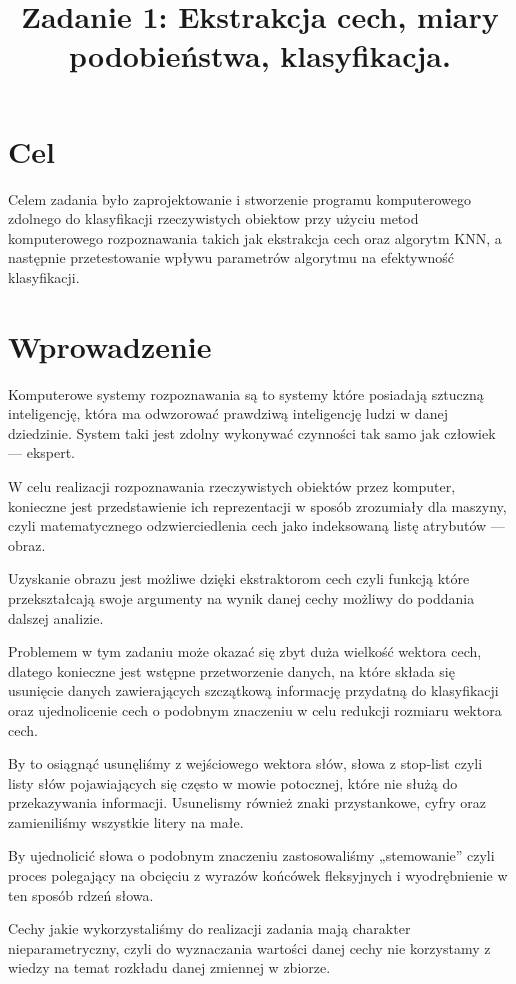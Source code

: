 \documentclass{classrep}
\author{
  \studentinfo{Bartosz Myśliwiec}{211827} \and
  \studentinfo{Mateusz Misiak}{211967} \and
}
\title{Zadanie 1:  Ekstrakcja cech, miary podobieństwa, klasyfikacja.}
\begin{document}
\maketitle

\section{Cel}

Celem zadania było zaprojektowanie i stworzenie programu komputerowego zdolnego do klasyfikacji 
rzeczywistych obiektow przy użyciu metod komputerowego rozpoznawania takich jak ekstrakcja cech oraz algorytm KNN, a następnie przetestowanie wpływu parametrów algorytmu na efektywność klasyfikacji.


\section{Wprowadzenie}
Komputerowe systemy rozpoznawania są to systemy które posiadają sztuczną inteligencję, która ma odwzorować prawdziwą inteligencję ludzi w danej dziedzinie. 
System taki jest zdolny wykonywać czynności tak samo jak człowiek — ekspert.


W celu realizacji rozpoznawania rzeczywistych obiektów przez komputer, konieczne jest przedstawienie ich reprezentacji w sposób zrozumiały dla maszyny, czyli matematycznego odzwierciedlenia cech jako indeksowaną listę atrybutów — obraz.


Uzyskanie obrazu jest możliwe dzięki ekstraktorom cech czyli funkcją które przekształcają swoje argumenty na wynik danej cechy możliwy do poddania dalszej analizie.


Problemem w tym zadaniu może okazać się zbyt duża wielkość wektora cech, dlatego konieczne jest wstępne przetworzenie danych, na które składa się usunięcie danych zawierających szczątkową informację przydatną do klasyfikacji oraz ujednolicenie cech o podobnym znaczeniu w celu redukcji rozmiaru wektora cech.


By to osiągnąć usunęliśmy z wejściowego wektora słów, słowa z stop-list czyli listy słów pojawiających się często w mowie potocznej, które nie służą do przekazywania informacji.
Usunelismy również znaki przystankowe, cyfry oraz zamieniliśmy wszystkie litery na małe.


By ujednolicić słowa o podobnym znaczeniu zastosowaliśmy „stemowanie” czyli proces polegający na obcięciu z wyrazów końcówek fleksyjnych i wyodrębnienie w ten sposób rdzeń słowa.


Cechy jakie wykorzystaliśmy do realizacji zadania mają charakter nieparametryczny, czyli do wyznaczania wartości danej cechy nie korzystamy z wiedzy na temat rozkładu danej zmiennej w zbiorze.
\end{document}

